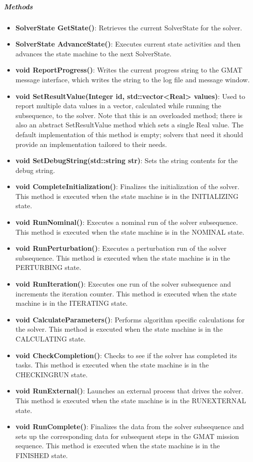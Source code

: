 \subparagraph{\textit{Methods}}
\begin{itemize}
\item \textbf{SolverState GetState()}:  Retrieves the current SolverState for the solver.
\item \textbf{SolverState AdvanceState()}:  Executes current state activities and then advances the
state machine to the next SolverState.
\item \textbf{void ReportProgress()}: Writes the current progress string to the GMAT message
interface, which writes the string to the log file and message window.
\item \textbf{void SetResultValue(Integer id, std::vector<Real> values)}:  Used to report multiple
data values in a vector, calculated while running the subsequence, to the solver.  Note
that this is an overloaded method; there is also an abstract SetResultValue method which sets a
single Real value.  The default implementation of this method is empty; solvers that need it should
provide an implementation tailored to their needs.
\item \textbf{void SetDebugString(std::string str)}:  Sets the string contents for the debug string.
\item \textbf{void CompleteInitialization()}:  Finalizes the initialization of the solver.  This
method is executed when the state machine is in the INITIALIZING state.
\item \textbf{void RunNominal()}:  Executes a nominal run of the solver subsequence.  This method is
executed when the state machine is in the NOMINAL state.
\item \textbf{void RunPerturbation()}: Executes a perturbation run of the solver subsequence.  This
method is executed when the state machine is in the PERTURBING state.
\item \textbf{void RunIteration()}:  Executes one run of the solver subsequence and increments the
iteration counter.  This method is executed when the state machine is in the ITERATING state.
\item \textbf{void CalculateParameters()}:  Performs algorithm specific calculations for the solver.
 This method is executed when the state machine is in the CALCULATING state.
\item \textbf{void CheckCompletion()}:  Checks to see if the solver has completed its tasks.  This
method is executed when the state machine is in the CHECKINGRUN state.
\item \textbf{void RunExternal()}:  Launches an external process that drives the solver.  This
method is executed when the state machine is in the RUNEXTERNAL state.
\item \textbf{void RunComplete()}:  Finalizes the data from the solver subsequence and sets up the
corresponding data for subsequent steps in the GMAT mission sequence.  This method is executed when
the state machine is in the FINISHED state.
\end{itemize}

